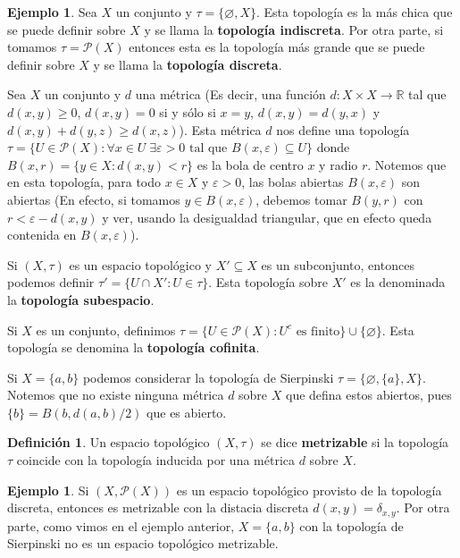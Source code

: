 \documentclass[12pt]{book}
\theoremstyle{definition}
\newtheorem{defn}[teo]{Definición}
\newtheorem{ex}[teo]{Ejemplo}
\newcommand{\RR}{\mathbb{R}}      %
\newcommand{\PP}{\mathscr{P}}
\let\emptyset\varnothing
\begin{document}
\begin{ex}
Sea $X$ un conjunto y $\tau = \{\emptyset, X\}$. Esta topología es la más chica que se puede definir sobre $X$ y se llama la \textbf{topología indiscreta}. Por otra parte, si tomamos $\tau = \PP(X)$ entonces esta es la topología más grande que se puede definir sobre $X$ y se llama la \textbf{topología discreta}.

Sea $X$ un conjunto y $d$ una métrica (Es decir, una función $d:X\times X\to \RR$ tal que $d(x,y)\geq 0$, $d(x,y)=0$ si y sólo si $x=y$, $d(x,y)=d(y,x)$ y $d(x,y)+d(y,z) \geq d(x,z)$). Esta métrica $d$ nos define una topología $\tau = \{U\in\PP(X) : \forall x\in U \; \exists \varepsilon >0 \text{ tal que } B(x,\varepsilon) \subseteq U\}$ donde $B(x,r)= \{y\in X : d(x,y) < r\}$ es la bola de centro $x$ y radio $r$. Notemos que en esta topología, para todo $x\in X$ y $\varepsilon > 0$, las bolas abiertas $B(x,\varepsilon)$ son abiertas (En efecto, si tomamos $y\in B(x,\varepsilon)$, debemos tomar $B(y,r)$ con $r< \varepsilon - d(x,y)$ y ver, usando la desigualdad triangular, que en efecto queda contenida en $B(x,\varepsilon)$).

Si $(X,\tau)$ es un espacio topológico y $X'\subseteq X$ es un subconjunto, entonces podemos definir $\tau' = \{U\cap X' : U\in \tau\}$. Esta topología sobre $X'$ es la denominada la \textbf{topología subespacio}.

Si $X$ es un conjunto, definimos $\tau = \{U\in \PP(X) : U^c \text{ es finito}\}\cup \{\emptyset\}$. Esta topología se denomina la \textbf{topología cofinita}.

Si $X=\{a,b\}$ podemos considerar la topología de Sierpinski $\tau = \{\emptyset, \{a\},X\}$. Notemos que no existe ninguna métrica $d$ sobre $X$ que defina estos abiertos, pues $\{b\} = B(b, d(a,b)/2)$ que es abierto.
\end{ex}

\begin{defn}
Un espacio topológico $(X,\tau)$ se dice \textbf{metrizable} si la topología $\tau$ coincide con la topología inducida por una métrica $d$ sobre $X$.
\end{defn}

\begin{ex}
Si $(X,\PP(X))$ es un espacio topológico provisto de la topología discreta, entonces es metrizable con la distacia discreta $d(x,y)=\delta_{x,y}$. Por otra parte, como vimos en el ejemplo anterior, $X=\{a,b\}$ con la topología de Sierpinski no es un espacio topológico metrizable.
\end{ex}
\end{document}
